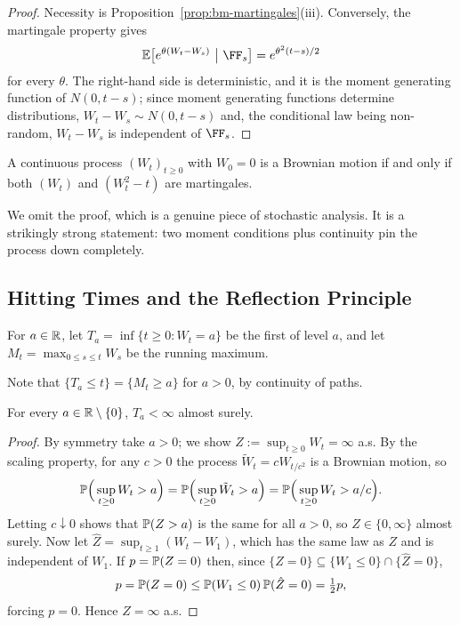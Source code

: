 \documentclass[a4paper]{scrartcl}
\begin{document}
\begin{proof}
	Necessity is Proposition~\ref{prop:bm-martingales}(iii). Conversely, the martingale property gives
	$$
	\EE\big[e^{\theta(W_t - W_s)}\ \big|\ \FF_s\big] = e^{\theta^2(t-s)/2}
	$$
	for every $\theta$. The right-hand side is deterministic, and it is the moment generating function of $N(0,t-s)$; since moment generating functions determine distributions, $W_t - W_s\sim N(0,t-s)$ and, the conditional law being non-random, $W_t-W_s$ is independent of $\FF_s$.
\end{proof}

\begin{theorem}
	A continuous process $(W_t)_{t\geq0}$ with $W_0=0$ is a Brownian motion if and only if both $(W_t)$ and $(W_t^2-t)$ are martingales.
\end{theorem}

We omit the proof, which is a genuine piece of stochastic analysis. It is a strikingly strong statement: two moment conditions plus continuity pin the process down completely.

\subsection{Hitting Times and the Reflection Principle}

\begin{definition}
	For $a \in \mathbb{R}$, let $T_a = \inf\{t\geq0 : W_t = a\}$ be the first  of level $a$, and let $M_t = \max_{0\leq s\leq t}W_s$ be the running maximum.
\end{definition}

Note that $\{T_a \leq t\} = \{M_t \geq a\}$ for $a>0$, by continuity of paths.

\begin{theorem}\label{thm:hit-finite}
	For every $a \in \mathbb{R}\setminus\{0\}$, $T_a < \infty$ almost surely.
\end{theorem}

\begin{proof}
	By symmetry take $a > 0$; we show $Z := \sup_{t\geq0}W_t = \infty$ a.s. By the scaling property, for any $c>0$ the process $\tilde W_t = cW_{t/c^2}$ is a Brownian motion, so
	$$
	\mathbb{P}\Big(\sup_{t\geq0}W_t > a\Big) = \mathbb{P}\Big(\sup_{t\geq0}\tilde W_t > a\Big) = \mathbb{P}\Big(\sup_{t\geq0}W_t > a/c\Big).
	$$
	Letting $c \downarrow 0$ shows that $\mathbb{P}(Z>a)$ is the same for all $a>0$, so $Z \in \{0,\infty\}$ almost surely. Now let $\hat Z = \sup_{t\geq1}(W_t - W_1)$, which has the same law as $Z$ and is independent of $W_1$. If $p = \mathbb{P}(Z = 0)$ then, since $\{Z=0\}\subseteq\{W_1\leq0\}\cap\{\hat Z = 0\}$,
	$$
	p = \mathbb{P}(Z=0) \leq \mathbb{P}(W_1\leq0)\,\mathbb{P}(\hat Z = 0) = \tfrac12 p,
	$$
	forcing $p = 0$. Hence $Z = \infty$ a.s.
\end{proof}
\end{document}
